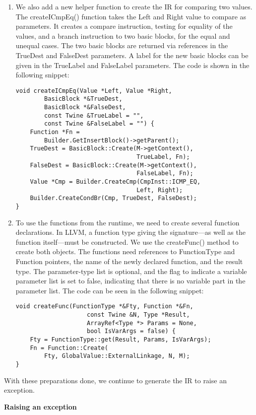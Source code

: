 \begin{enumerate}
\item We also add a new helper function to create the IR for comparing two values. The createICmpEq() function takes the Left and Right value to compare as parameters. It creates a compare instruction, testing for equality of the values, and a branch instruction to two basic blocks, for the equal and unequal cases. The two basic blocks are returned via references in the TrueDest and FalseDest parameters. A label for the new basic blocks can be given in the TrueLabel and FalseLabel parameters. The code is shown in the following snippet:
\begin{lstlisting}[caption={}]
void createICmpEq(Value *Left, Value *Right,
		BasicBlock *&TrueDest,
		BasicBlock *&FalseDest,
		const Twine &TrueLabel = "",
		const Twine &FalseLabel = "") {
	Function *Fn =
		Builder.GetInsertBlock()->getParent();
	TrueDest = BasicBlock::Create(M->getContext(),
								  TrueLabel, Fn);
	FalseDest = BasicBlock::Create(M->getContext(),
								  FalseLabel, Fn);
	Value *Cmp = Builder.CreateCmp(CmpInst::ICMP_EQ,
								  Left, Right);
	Builder.CreateCondBr(Cmp, TrueDest, FalseDest);
}
\end{lstlisting}

\item To use the functions from the runtime, we need to create several function declarations. In LLVM, a function type giving the signature—as well as the function itself—must be constructed. We use the createFunc() method to create both objects. The functions need references to FunctionType and Function pointers, the name of the newly declared function, and the result type. The parameter-type list is optional, and the flag to indicate a variable parameter list is set to false, indicating that there is no variable part in the parameter list. The code can be seen in the following snippet:
\begin{lstlisting}[caption={}]
void createFunc(FunctionType *&Fty, Function *&Fn,
					const Twine &N, Type *Result,
					ArrayRef<Type *> Params = None,
					bool IsVarArgs = false) {
	Fty = FunctionType::get(Result, Params, IsVarArgs);
	Fn = Function::Create(
		Fty, GlobalValue::ExternalLinkage, N, M);
}
\end{lstlisting}
\end{enumerate}

With these preparations done, we continue to generate the IR to raise an exception.\par

\hspace*{\fill} \par %
\textbf{Raising an exception}

